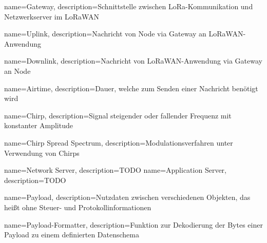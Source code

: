 



{
  name=Gateway,
  description={Schnittstelle zwischen \acrshort{LoRa}-Kommunikation und Netzwerkserver im \acrshort{LoRaWAN}}
}

{
  name=Uplink,
  description={Nachricht von \acrshort{Node} via \gls{Gateway} an \acrshort{LoRaWAN}-Anwendung}
}

{
  name=Downlink,
  description={Nachricht von \acrshort{LoRaWAN}-Anwendung via \gls{Gateway} an \acrshort{Node}}
}

{
  name=Airtime,
  description={Dauer, welche zum Senden einer Nachricht benötigt wird}
}

{
  name=Chirp,
  description={Signal steigender oder fallender Frequenz mit konstanter Amplitude}
}

{
  name=Chirp Spread Spectrum,
  description={Modulationsverfahren unter Verwendung von \glspl{Chirp}}
}

{
  name=Network Server,
  description={TODO }
}
{
  name=Application Server,
  description={TODO }
}

{
  name=Payload,
  description={Nutzdaten  zwischen verschiedenen Objekten, das heißt ohne Steuer- und Protokollinformationen}
}

{
  name=Payload-Formatter,
  description={Funktion zur Dekodierung der Bytes einer \gls{Payload} zu einem definierten Datenschema}
}
